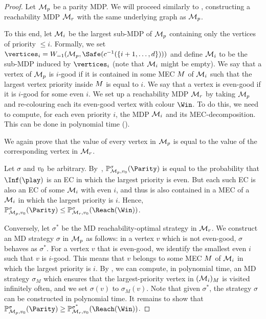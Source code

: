 \begin{proof}
Let $\mathcal{M}_p$ be a parity MDP. We will proceed similarly to , constructing a reachability MDP $\mathcal{M}_r$ with the same underlying graph as $\mathcal{M}_p$.

To this end, let $\mathcal{M}_i$ be the largest sub-MDP of $\mathcal{M}_p$ containing only the vertices of priority $\leq i$. Formally, we set $\vertices_i = \winAS(\mdp_p,\Safe(\colouring^{-1}(\{i+1,\ldots,d\})) )$ and define $\mathcal{M}_i$ to be the sub-MDP induced by $\vertices_i$ (note that $\mathcal{M}_i$ might be empty). We say that a vertex of $\mathcal{M}_p$ is $i$-good if it is contained in some MEC $M$ of $\mathcal{M}_i$ such that the largest vertex priority inside $M$ is equal to $i$. We say that a vertex is even-good if it is $i$-good for some even $i$. We set up a reachability MDP $\mathcal{M}_r$ by taking $\mathcal{M}_p$ and re-colouring each its even-good vertex with colour $\Win$. To do this, we need to compute, for each even priority $i$, the MDP $\mathcal{M}_i$ and its MEC-decomposition. This can be done in polynomial time (). 

We again prove that the value of every vertex in $\mathcal{M}_p$ is equal to the value of the corresponding vertex in $\mathcal{M}_r$.

Let $\sigma$ and $v_0$ be arbitrary. By~, $\probm^\sigma_{\mdp_p,\vinit}(\Parity)$ is equal to the probability that $\Inf(\play)$  is an EC in which the largest priority is even. But each such EC is also an EC of some $\mathcal{M}_i$ with even $i$, and thus is also contained in a MEC of a $\mathcal{M}_i$ in which the largest priority is $ i $. Hence, $\probm^\sigma_{\mdp_p,\vinit}(\Parity)\leq \probm^\sigma_{\mdp_r,\vinit}(\Reach(\Win))$.

Conversely, let $\sigma^*$ be the MD reachability-optimal strategy in $\mathcal{M}_r$. We construct an MD strategy $\sigma$ in $\mathcal{M}_p$ as follows: in a vertex $v$ which is not even-good, $\sigma$ behaves as $\sigma^*$. For a vertex $v$ that is even-good, we identify the smallest even $i$ such that $v$ is $i$-good. 
This means that $v$ belongs to some MEC $M$ of $\mathcal{M}_i$ in which the largest priority is $i$. 
By , we can compute, in polynomial time, an MD strategy $\sigma_M$ which ensures that the largest-priority vertex in $(\mathcal{M}_i)_M$ is visited infinitely often, and we set $\sigma(v)$ to $\sigma_M(v)$. Note that given $\sigma^*$, the strategy $\sigma$ can be constructed in polynomial time. It remains to show that $\probm^\sigma_{\mdp_p,\vinit}(\Parity)\geq \probm^{\sigma^*}_{\mdp_r,\vinit}(\Reach(\Win))$.


\end{proof}
